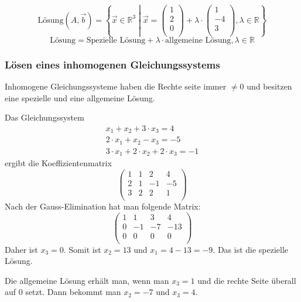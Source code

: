 \[ \text{Lösung}(A, \vec{b}) = \left \{
    \vec{x} \in \mathbb{R}^3 \middle |
      \vec{x} = \left( \begin {array} {c} 1 \\ 2 \\ 0 \\ \end {array} \right) +
      \lambda \cdot \left( \begin {array} {c} 1 \\ -4 \\ 3 \\ \end {array} \right), 
      \lambda \in \mathbb{R}
  \right \} \]
\[ \text{Lösung} = \text{Spezielle Lösung} + \lambda \cdot \text{
allgemeine Lösung}, \lambda \in \mathbb{R} \]

\subsubsection{Lösen eines inhomogenen Gleichungssystems}
Inhomogene Gleichungssysteme haben die Rechte seite immer $\ne 0$ und
besitzen eine spezielle und eine allgemeine Lösung.

Das Gleichungssystem
\begin{align}
  x_1 + x_2 + 3 \cdot x_3 = 4 \\
  2 \cdot x_1 + x_2 - x_3 = -5 \\
  3 \cdot x_1 + 2 \cdot x_2 + 2 \cdot x_3 = -1
\end{align}
ergibt die Koeffizientenmatrix
\[ \begin {pmatrix}
  1       & 1       & 2  & 4 \\
  2       & 1       & -1  & -5 \\
  3       & 2       & 2  & 1 \\
\end {pmatrix} \]
Nach der Gauss-Elimination hat man folgende Matrix:
\[ \begin {pmatrix}
  1       & 1       & 3  & 4 \\
  0       & -1       & -7  & -13 \\
  0       & 0       & 0  & 0 \\
\end {pmatrix} \]
Daher ist $x_3 = 0$. Somit ist $x_2 = 13$ und $x_1 = 4 - 13 = -9$. Das
ist die spezielle Lösung.

Die allgemeine Lösung erhält man, wenn man $x_3 = 1$ und die
rechte Seite überall auf 0 setzt. Dann bekommt
man $x_2 = -7$ und $x_3 = 4$.

